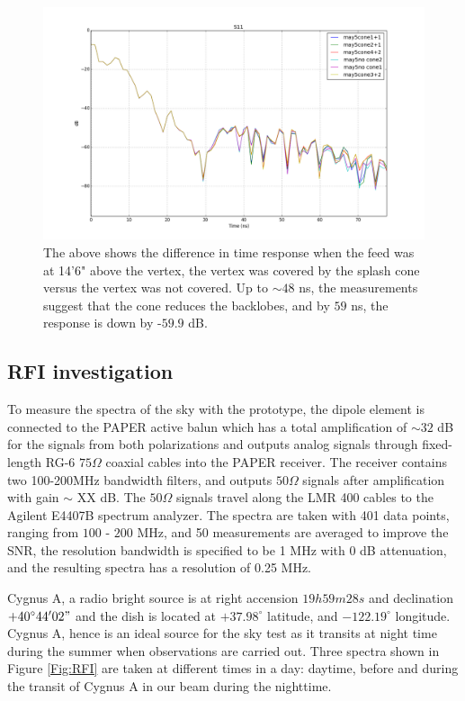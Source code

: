 \documentclass[preprint]{aastex}  %
\begin{document}
\begin{figure}[H]
	\begin{center}
	\includegraphics[width =.7\textwidth]{reflectometry_plots/May5/S11_cone_effect}
	\caption{The above shows the difference in time response when the feed was at 14'6" 
above the vertex, the vertex was covered by the splash cone versus the vertex was not covered.  
Up to $\sim 48$ ns, the measurements suggest that the cone reduces the backlobes, and by 
$59$ ns, the response is down by -$59.9$ dB.  
\label{Fig:conetest} }
	\end{center}
\end{figure}
\clearpage
\subsection{RFI investigation}
\label{sec:RFI}
To measure the spectra of the sky with the prototype, the dipole element is connected to the PAPER active balun which has a total amplification of $\sim 32$ dB for the signals from both polarizations and outputs analog signals through fixed-length RG-6 $75\Omega$ coaxial cables into the PAPER receiver. The receiver contains two 100-200MHz bandwidth filters, and outputs $50\Omega$ signals after amplification with gain $\sim$ XX dB. The $50\Omega$ signals travel along the LMR 400 cables to the Agilent E4407B spectrum analyzer. The spectra are taken with 401 data points, ranging from $100$ - $200$ MHz, and 50 measurements are averaged to improve the SNR, the resolution bandwidth is specified to be 1 MHz with 0 dB attenuation, and the resulting spectra has a resolution of 0.25 MHz.

Cygnus A, a radio bright source is at right accension $19h59m28s$ and declination $+40^\circ44'02"$ and the dish is located at $+37.98^\circ$ latitude, and $-122.19^\circ$ longitude. Cygnus A, hence is an ideal source for the sky test as it transits at night time during the summer when observations are carried out. Three spectra shown in Figure \ref{Fig:RFI} are taken at different times in a day: daytime, before and during the transit of Cygnus A in our beam during the nighttime.
\end{document}
